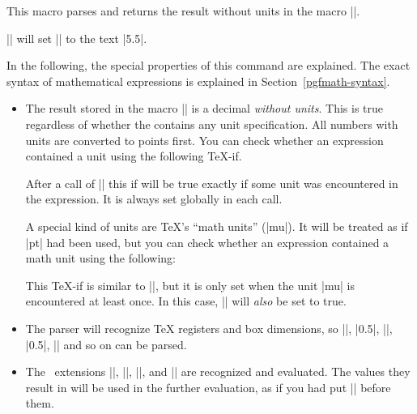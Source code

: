 \begin{command}{\pgfmathparse{}}
  This macro parses  and returns the result without
  units in  the macro |\pgfmathresult|.

  \example |\pgfmathparse{2pt+3.5pt}| will set |\pgfmathresult| to the
  text |5.5|.

  In the following, the special properties of this command are
  explained. The exact syntax of mathematical expressions is explained
  in Section~\ref{pgfmath-syntax}.

  \begin{itemize}
  \item
    The result stored in the macro |\pgfmathresult| is a decimal
    \emph{without units}. This is true regardless of whether the
     contains any unit specification. All numbers
    with units are converted to points first.
    You can check whether an expression contained a unit using
    the following \TeX-if.
    {\let\ifpgfmathunitsdeclared\relax
      \begin{command}{\ifpgfmathunitsdeclared}
        After a call  of |\pgfmathparse| this if will be true exactly if
        some unit was encountered in the expression. It is always set
        globally in each call.
      \end{command}
    }
    
    A special kind of units are \TeX's ``math units'' (|mu|). It will
    be treated as if |pt| had been used, but you can
    check whether an expression contained a math unit using the
    following: 
    {\let\ifpgfmathmathunitsdeclared\relax
      \begin{command}{\ifpgfmathmathunitsdeclared}
        This \TeX-if is similar to |\ifpgfmathunitsdeclared|, but it
        is only set when the unit |mu| is encountered at least
        once. In this case, |\ifpgfmathunitsdeclared| will \emph{also}
        be set to true.
      \end{command}
    }
  \item
    The parser will recognize \TeX{} registers and box dimensions,
    so |\mydimen|, |0.5\mydimen|, |\wd\mybox|, |0.5\dp\mybox|,
    |\mycount\mydimen| and so on can be parsed.
    
  \item
    The \eTeX\ extensions |\dimexpr|, |\numexpr|, |\glueexpr|, and
    |\muexpr| are recognized and evaluated. The values they
    result in will be used in the further evaluation, as if you had
    put |\the| before them. 
    

\end{itemize}
\end{command}
